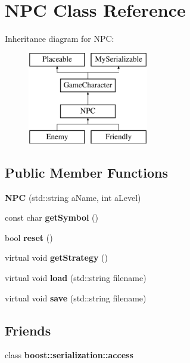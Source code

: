 \hypertarget{class_n_p_c}{}\section{N\+PC Class Reference}
\label{class_n_p_c}
Inheritance diagram for N\+PC\+:\begin{figure}[H]
\begin{center}
\leavevmode
\includegraphics[height=4.000000cm]{class_n_p_c}
\end{center}
\end{figure}
\subsection*{Public Member Functions}
\begin{DoxyCompactItemize}
\item 
\hypertarget{class_n_p_c_ad33bef700a6b0b6d5619dc8af4e9ac62}{}\label{class_n_p_c_ad33bef700a6b0b6d5619dc8af4e9ac62} 
{\bfseries N\+PC} (std\+::string a\+Name, int a\+Level)
\item 
\hypertarget{class_n_p_c_a7e81f8ecedc0eb22349a68cd224dbc23}{}\label{class_n_p_c_a7e81f8ecedc0eb22349a68cd224dbc23} 
const char {\bfseries get\+Symbol} ()
\item 
\hypertarget{class_n_p_c_a90707f8d4132352e3a79f1774df9a3aa}{}\label{class_n_p_c_a90707f8d4132352e3a79f1774df9a3aa} 
bool {\bfseries reset} ()
\item 
\hypertarget{class_n_p_c_afd87c014b5c0d6d4404e9b1fa0ab35fa}{}\label{class_n_p_c_afd87c014b5c0d6d4404e9b1fa0ab35fa} 
virtual void {\bfseries get\+Strategy} ()
\item 
\hypertarget{class_n_p_c_a09d4b4500a23e4919915ba60682f2d20}{}\label{class_n_p_c_a09d4b4500a23e4919915ba60682f2d20} 
virtual void {\bfseries load} (std\+::string filename)
\item 
\hypertarget{class_n_p_c_a2ac4ef18f0adffd50ec066347ed027a6}{}\label{class_n_p_c_a2ac4ef18f0adffd50ec066347ed027a6} 
virtual void {\bfseries save} (std\+::string filename)
\end{DoxyCompactItemize}
\subsection*{Friends}
\begin{DoxyCompactItemize}
\item 
\hypertarget{class_n_p_c_ac98d07dd8f7b70e16ccb9a01abf56b9c}{}\label{class_n_p_c_ac98d07dd8f7b70e16ccb9a01abf56b9c} 
class {\bfseries boost\+::serialization\+::access}
\end{DoxyCompactItemize}


